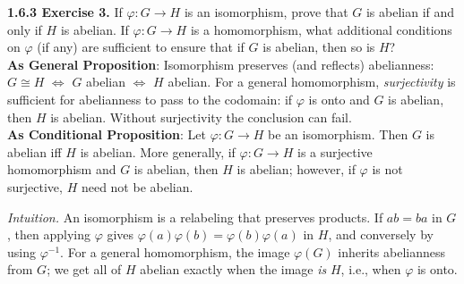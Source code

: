 \documentclass[12pt]{article}
\theoremstyle{definition}
\begin{document}
\newpage

\noindent \textbf{1.6.3 Exercise 3.} If $\varphi:G\to H$ is an isomorphism, prove that $G$ is abelian if and only if $H$ is abelian. If $\varphi:G\to H$ is a homomorphism, what additional conditions on $\varphi$ (if any) are sufficient to ensure that if $G$ is abelian, then so is $H$?\\ %

\noindent\textbf{As General Proposition}: Isomorphism preserves (and reflects) abelianness: $G\cong H$ $\Longleftrightarrow$ $G$ abelian $\Longleftrightarrow$ $H$ abelian. For a general homomorphism, \emph{surjectivity} is sufficient for abelianness to pass to the codomain: if $\varphi$ is onto and $G$ is abelian, then $H$ is abelian. Without surjectivity the conclusion can fail.\\

\noindent \textbf{As Conditional Proposition}: Let $\varphi:G\to H$ be an isomorphism. Then $G$ is abelian iff $H$ is abelian. More generally, if $\varphi:G\to H$ is a surjective homomorphism and $G$ is abelian, then $H$ is abelian; however, if $\varphi$ is not surjective, $H$ need not be abelian.

\newpage

\dotfill

\emph{Intuition.} An isomorphism is a relabeling that preserves products. If $ab=ba$ in $G$, then applying $\varphi$ gives $\varphi(a)\varphi(b)=\varphi(b)\varphi(a)$ in $H$, and conversely by using $\varphi^{-1}$. For a general homomorphism, the image $\varphi(G)$ inherits abelianness from $G$; we get all of $H$ abelian exactly when the image \emph{is} $H$, i.e., when $\varphi$ is onto.\\

\dotfill
\end{document}
